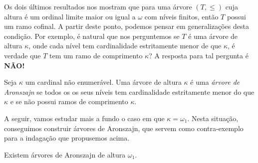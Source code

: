 \documentclass[a4paper]{article}
\begin{document}
  Os dois últimos resultados nos mostram que para uma árvore \((T,\leq)\) cuja altura é um
  ordinal limite maior ou igual a \(\omega\) com níveis finitos, então \(T\)
  possui um ramo cofinal. A partir deste ponto, podemos pensar em generalizações
  desta condição. Por exemplo, é natural que nos perguntemos se $T$ é uma árvore
  de altura $\kappa$, onde cada nível tem cardinalidade estritamente menor de
  que \(\kappa\), é verdade que $T$ tem um
  ramo de comprimento $\kappa$?  A resposta para tal pergunta é \textbf{NÃO!}

  \begin{definition}
    Seja \(\kappa\) um cardinal não enumerável.
    Uma árvore de altura $\kappa$ é uma \textit{árvore de Aronszajn} se
    todos os os seus níveis tem cardinalidade estritamente menor do que \(\kappa\)
    e se não possui ramos de comprimento $\kappa$.
  \end{definition}

 A seguir, vamos estudar mais a fundo o caso em que \(\kappa=\omega_1\). Nesta
  situação, conseguimos construir árvores de Aronszajn, que servem como
  contra-exemplo  para a indagação que propusemos acima.
  
    \begin{teo}
  Existem árvores de Aronszajn de altura $\omega_1$.
    \end{teo}
\end{document}
